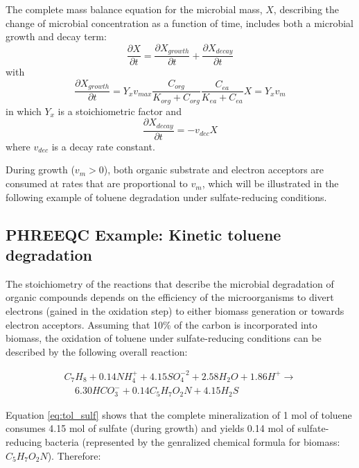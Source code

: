 The complete mass balance equation for the microbial mass, $X$, describing the change of microbial concentration as a function of time, includes both a microbial growth and decay term:
\begin{equation}
\frac{\partial X}{\partial t} = \frac{\partial X_{growth}}{\partial t} + \frac{\partial X_{decay}}{\partial t}
\end{equation}
with
\begin{equation}
\frac{\partial X_{growth}}{\partial t} = Y_x v_{max} \frac{C_{org}}{K_{org} + C_{org}} \frac{C_{ea}}{K_{ea} + C_{ea}} X = Y_x v_m
\label{eq:X_growth}
\end{equation}
in which $Y_x$ is a stoichiometric factor and
\begin{equation}
\frac{\partial X_{decay}}{\partial t} = -v_{dec} X
\label{eq:X_decay}
\end{equation}
where $v_{dec}$ is a decay rate constant.

During growth ($v_m > 0$), both organic substrate and electron acceptors are consumed at rates that are proportional to $v_m$, which will be illustrated in the following example of toluene degradation under sulfate-reducing conditions.

\subsection{PHREEQC Example: Kinetic toluene degradation}
The stoichiometry of the reactions that describe the microbial degradation of organic compounds depends on the efficiency of the microorganisms to divert electrons (gained in the oxidation step) to either biomass generation or towards electron acceptors. Assuming that 10\% of the carbon is incorporated into biomass, the oxidation of toluene under sulfate-reducing conditions can be described by the following overall reaction:

\begin{eqnarray}
C_7H_8 + 0.14NH_4^+ + 4.15 SO_4^{-2} + 2.58H_2O + 1.86H^+ \rightarrow  \nonumber \\
 \ \  \  \  \  6.30HCO_3^- + 0.14 C_5H_7O_2N + 4.15 H_2S
\label{eq:tol_sulf}
\end{eqnarray}

Equation \ref{eq:tol_sulf} shows that the complete mineralization of 1 mol of toluene consumes 4.15 mol of sulfate (during growth) and yields 0.14 mol of sulfate-reducing bacteria (represented by the genralized chemical formula for biomass: $C_5H_7O_2N$). Therefore:

